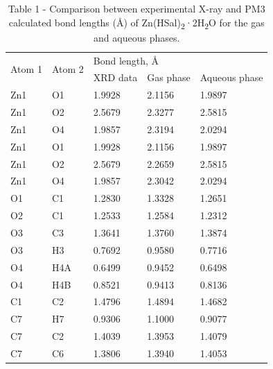 \begin{table}[H]
\caption*{Table 1 - Comparison between experimental X-ray and PM3 calculated bond lengths (Å) of Zn(HSal)\textsubscript{2}·2H\textsubscript{2}O for the gas and aqueous phases.}
\centering
\begin{tabular}{|l|l|lll|}
\hline
\multirow{2}{*}{Atom 1} & \multirow{2}{*}{Atom 2} & \multicolumn{3}{l|}{Bond length, Å} \\ \cline{3-5} 
 &  & \multicolumn{1}{l|}{XRD data} & \multicolumn{1}{l|}{Gas phase} & Aqueous phase \\ \hline
Zn1 & O1 & \multicolumn{1}{l|}{1.9928} & \multicolumn{1}{l|}{2.1156} & 1.9897 \\ \hline
Zn1 & O2 & \multicolumn{1}{l|}{2.5679} & \multicolumn{1}{l|}{2.3277} & 2.5815 \\ \hline
Zn1 & O4 & \multicolumn{1}{l|}{1.9857} & \multicolumn{1}{l|}{2.3194} & 2.0294 \\ \hline
Zn1 & O1 & \multicolumn{1}{l|}{1.9928} & \multicolumn{1}{l|}{2.1156} & 1.9897 \\ \hline
Zn1 & O2 & \multicolumn{1}{l|}{2.5679} & \multicolumn{1}{l|}{2.2659} & 2.5815 \\ \hline
Zn1 & O4 & \multicolumn{1}{l|}{1.9857} & \multicolumn{1}{l|}{2.3042} & 2.0294 \\ \hline
O1 & C1 & \multicolumn{1}{l|}{1.2830} & \multicolumn{1}{l|}{1.3328} & 1.2651 \\ \hline
O2 & C1 & \multicolumn{1}{l|}{1.2533} & \multicolumn{1}{l|}{1.2584} & 1.2312 \\ \hline
O3 & C3 & \multicolumn{1}{l|}{1.3641} & \multicolumn{1}{l|}{1.3760} & 1.3874 \\ \hline
O3 & H3 & \multicolumn{1}{l|}{0.7692} & \multicolumn{1}{l|}{0.9580} & 0.7716 \\ \hline
O4 & H4A & \multicolumn{1}{l|}{0.6499} & \multicolumn{1}{l|}{0.9452} & 0.6498 \\ \hline
O4 & H4B & \multicolumn{1}{l|}{0.8521} & \multicolumn{1}{l|}{0.9413} & 0.8136 \\ \hline
C1 & C2 & \multicolumn{1}{l|}{1.4796} & \multicolumn{1}{l|}{1.4894} & 1.4682 \\ \hline
C7 & H7 & \multicolumn{1}{l|}{0.9306} & \multicolumn{1}{l|}{1.1000} & 0.9077 \\ \hline
C7 & C2 & \multicolumn{1}{l|}{1.4039} & \multicolumn{1}{l|}{1.3953} & 1.4079 \\ \hline
C7 & C6 & \multicolumn{1}{l|}{1.3806} & \multicolumn{1}{l|}{1.3940} & 1.4053 \\ \hline

\end{tabular}
\end{table}
